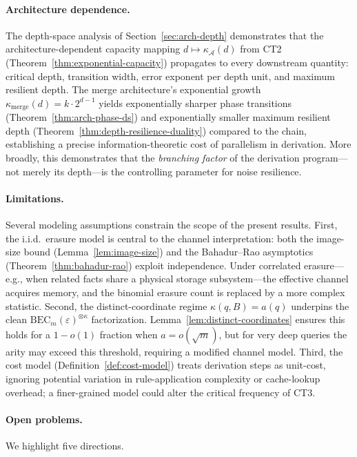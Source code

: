 \documentclass[journal]{IEEEtran}
\numberwithin{equation}{section}
\begin{document}
\paragraph{Architecture dependence.}
The depth-space analysis of Section~\ref{sec:arch-depth}
demonstrates that the architecture-dependent capacity mapping
$d\mapsto\kappa_{\mathcal A}(d)$ from CT2
(Theorem~\ref{thm:exponential-capacity}) propagates to every
downstream quantity: critical depth, transition width, error
exponent per depth unit, and maximum resilient depth.
The merge architecture's exponential growth
$\kappa_{\mathrm{merge}}(d)=k\cdot 2^{d-1}$ yields
exponentially sharper phase transitions
(Theorem~\ref{thm:arch-phase-ds}) and exponentially smaller
maximum resilient depth
(Theorem~\ref{thm:depth-resilience-duality}) compared to the
chain, establishing a precise information-theoretic cost
of parallelism in derivation.
More broadly, this demonstrates that the \emph{branching factor}
of the derivation program---not merely its depth---is the
controlling parameter for noise resilience.

\paragraph{Limitations.}
Several modeling assumptions constrain the scope of the present
results.
First, the i.i.d.\ erasure model is central to the channel
interpretation: both the image-size bound
(Lemma~\ref{lem:image-size}) and the Bahadur--Rao asymptotics
(Theorem~\ref{thm:bahadur-rao}) exploit independence.
Under correlated erasure---e.g., when related facts share a
physical storage subsystem---the effective channel acquires
memory, and the binomial erasure count is replaced by a more
complex statistic.
Second, the distinct-coordinate regime
$\kappa(q,B)=a(q)$ underpins the clean
$\mathrm{BEC}_m(\varepsilon)^{\otimes\kappa}$ factorization.
Lemma~\ref{lem:distinct-coordinates} ensures this holds for a
$1{-}o(1)$ fraction when $a=o(\sqrt m)$, but for very deep
queries the arity may exceed this threshold, requiring a
modified channel model.
Third, the cost model
(Definition~\ref{def:cost-model}) treats derivation steps as
unit-cost, ignoring potential variation in rule-application
complexity or cache-lookup overhead; a finer-grained model
could alter the critical frequency of CT3.

\paragraph{Open problems.}
We highlight five directions.
\end{document}
